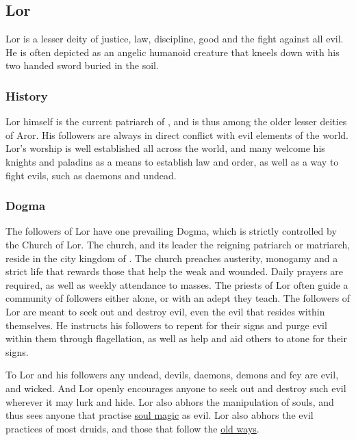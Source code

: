 \subsection{Lor}
\label{sec:Lor}

Lor is a lesser deity of justice, law, discipline, good and the fight against
all evil. He is often depicted as an angelic humanoid creature that kneels
down with his two handed sword buried in the soil.

\subsubsection{History}

Lor himself is the current patriarch of , and is thus
among the older lesser deities of Aror. His followers are always in direct
conflict with evil elements of the world. Lor's worship is well established
all across the world, and many welcome his knights and paladins as a means to
establish law and order, as well as a way to fight evils, such as daemons and
undead.

\subsubsection{Dogma}

The followers of Lor have one prevailing Dogma, which is strictly controlled
by the Church of Lor. The church, and its leader the reigning patriarch or
matriarch, reside in the city kingdom of . The church
preaches austerity, monogamy and a strict life that rewards those that help
the weak and wounded. Daily prayers are required, as well as weekly attendance
to masses. The priests of Lor often guide a community of followers either
alone, or with an adept they teach. The followers of Lor are meant to seek out
and destroy evil, even the evil that resides within themselves. He instructs
his followers to repent for their signs and purge evil within them through
flagellation, as well as help and aid others to atone for their signs.

To Lor and his followers any undead, devils, daemons, demons and fey are evil,
and wicked. And Lor openly encourages anyone to seek out and destroy such
evil wherever it may lurk and hide. Lor also abhors the manipulation of souls,
and thus sees anyone that practise \hyperref[sec:Soul Magic]{soul magic} as
evil. Lor also abhors the evil practices of most druids, and those that follow
the \hyperref[sec:Old Ways]{old ways}.

